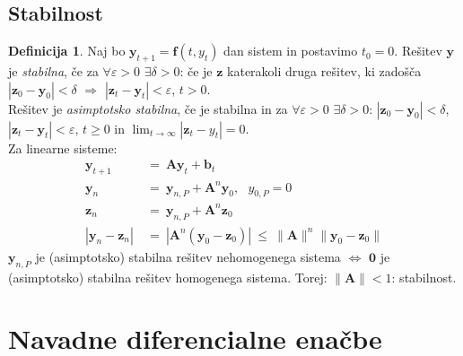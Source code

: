 \documentclass[11pt]{article}
\renewcommand{\b}{\mathbf{b}}
\newcommand{\f}{\mathbf{f}}
\newcommand{\y}{\mathbf{y}}
\newcommand{\z}{\mathbf{z}}
\newcommand{\A}{\mathbf{A}}
\newcommand{\0}{\mathbf{0}}
\theoremstyle{definition}
\newtheorem{definicija}{Definicija}[section]
\theoremstyle{definition}
\theoremstyle{definition}
\theoremstyle{definition}
\begin{document}

\subsection{Stabilnost}
\vspace{0.5cm}

\begin{definicija}

Naj bo $\y_{t+1} = \f(t,y_t)$ dan sistem in postavimo $t_0 = 0$. Rešitev $\y$ je \textit{stabilna}, če za $\forall \varepsilon > 0$ $\exists \delta > 0$: če je $\z$ katerakoli druga rešitev, ki zadošča $|\z_0 - \y_0| < \delta$ $\Rightarrow$ $|\z_t - \y_t| < \varepsilon$, $t>0$. \\

\noindent Rešitev je \textit{asimptotsko stabilna}, če je stabilna in za $\forall \varepsilon>0$ $\exists \delta>0$: \hbox{$|\z_0 - \y_0| < \delta$}, $|\z_t - \y_t| < \varepsilon$, $t\geq 0$ in $\lim_{t \rightarrow \infty} |\z_t - y_t| = 0$. \\

\noindent Za linearne sisteme:
\begin{align*}
\y_{t+1} ~&=~ \A \y_t + \b_t \\
\y_n ~&=~ \y_{n,P} + \A^n \y_0, ~~~y_{0,P} = 0 \\
\z_n ~&=~ \y_{n,P} + \A^n \z_0 \\
|\y_n - \z_n| ~&=~ |\A^n(\y_0 - \z_0)| ~\leq~ \|\A\|^n \|\y_0 - \z_0\|
\end{align*}
$\y_{n,P}$ je (asimptotsko) stabilna rešitev nehomogenega sistema $\iff$ $\mathbf{0}$ je (asimptotsko) stabilna rešitev homogenega sistema. Torej: $\|\A\| <1$: stabilnost.

\end{definicija}
\vspace{0.5cm}


\pagebreak


\section{Navadne diferencialne enačbe}
\vspace{0.5cm}
\end{document}
